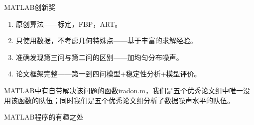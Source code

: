 \documentclass{beamer}
\begin{document}
\begin{frame}{MATLAB创新奖}
	\begin{enumerate}
	  \item \small 原创算法——标定，FBP，ART。
	  \item \small 只使用数据，不考虑几何特殊点——基于丰富的求解经验。
	  \item \small 准确发现第三问与第二问的区别——加均匀分布噪声。
	  \item \small 论文框架完整——第一到四问模型+稳定性分析+模型评价。
	\end{enumerate}
	\small MATLAB中有自带解决该问题的函数iradon.m，我们是五个优秀论文组中唯一没用该函数的队伍；同时我们是五个优秀论文组分析了数据噪声水平的队伍。
\end{frame}

\begin{frame}{MATLAB程序的有趣之处}

\end{frame}



\end{document}

